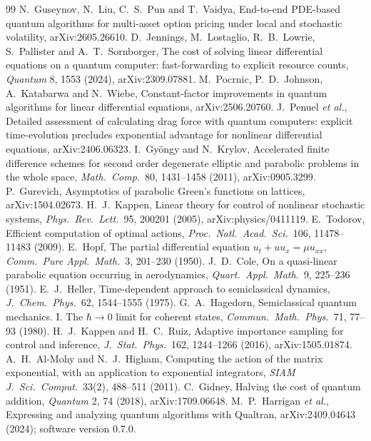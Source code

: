 \documentclass[11pt,a4paper]{article}
\theoremstyle{remark}
\begin{document}
\begin{thebibliography}{99}
 N.~Guseynov, N.~Liu, C.~S.~Pun and T.~Vaidya, End-to-end PDE-based quantum algorithms for multi-asset option pricing under local and stochastic volatility, arXiv:2605.26610.
 D.~Jennings, M.~Lostaglio, R.~B.~Lowrie, S.~Pallister and A.~T.~Sornborger, The cost of solving linear differential equations on a quantum computer: fast-forwarding to explicit resource counts, \emph{Quantum} 8, 1553 (2024), arXiv:2309.07881.
 M.~Pocrnic, P.~D.~Johnson, A.~Katabarwa and N.~Wiebe, Constant-factor improvements in quantum algorithms for linear differential equations, arXiv:2506.20760.
 J.~Penuel \emph{et al.}, Detailed assessment of calculating drag force with quantum computers: explicit time-evolution precludes exponential advantage for nonlinear differential equations, arXiv:2406.06323.
 I.~Gy\"ongy and N.~Krylov, Accelerated finite difference schemes for second order degenerate elliptic and parabolic problems in the whole space, \emph{Math.~Comp.}~80, 1431--1458 (2011), arXiv:0905.3299.
 P.~Gurevich, Asymptotics of parabolic Green's functions on lattices, arXiv:1504.02673.
 H.~J.~Kappen, Linear theory for control of nonlinear stochastic systems, \emph{Phys.~Rev.~Lett.}~95, 200201 (2005), arXiv:physics/0411119.
 E.~Todorov, Efficient computation of optimal actions, \emph{Proc.~Natl.~Acad.~Sci.}~106, 11478--11483 (2009).
 E.~Hopf, The partial differential equation $u_t+uu_x=\mu u_{xx}$, \emph{Comm.~Pure Appl.~Math.}~3, 201--230 (1950).
 J.~D.~Cole, On a quasi-linear parabolic equation occurring in aerodynamics, \emph{Quart.~Appl.~Math.}~9, 225--236 (1951).
 E.~J.~Heller, Time-dependent approach to semiclassical dynamics, \emph{J.~Chem.~Phys.}~62, 1544--1555 (1975).
 G.~A.~Hagedorn, Semiclassical quantum mechanics. I. The $\hbar\to0$ limit for coherent states, \emph{Commun.~Math.~Phys.}~71, 77--93 (1980).
 H.~J.~Kappen and H.~C.~Ruiz, Adaptive importance sampling for control and inference, \emph{J.~Stat.~Phys.}~162, 1244--1266 (2016), arXiv:1505.01874.
 A.~H.~Al-Mohy and N.~J.~Higham, Computing the action of the matrix exponential, with an application to exponential integrators, \emph{SIAM J.~Sci.~Comput.}~33(2), 488--511 (2011).
 C.~Gidney, Halving the cost of quantum addition, \emph{Quantum} 2, 74 (2018), arXiv:1709.06648.
 M.~P.~Harrigan \emph{et al.}, Expressing and analyzing quantum algorithms with Qualtran, arXiv:2409.04643 (2024); software version 0.7.0.

\end{thebibliography}
\end{document}
